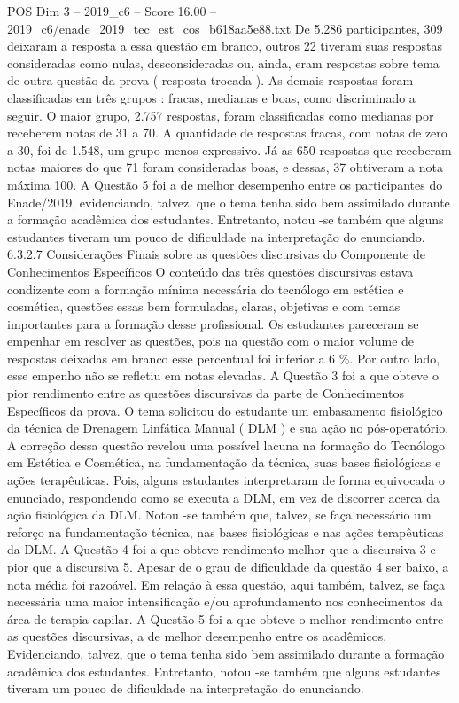 \begin{textsample}{POS Dim 3 – 2019\_c6 – Score 16.00 – 2019\_c6/enade\_2019\_tec\_est\_cos\_b618aa5e88.txt}
De 5.286 participantes, 309 deixaram a resposta a essa questão em branco, outros 22 tiveram suas respostas consideradas como nulas, desconsideradas ou, ainda, eram respostas sobre tema de outra questão da prova ( resposta trocada ).
As demais respostas foram classificadas em três grupos : fracas, medianas e boas, como discriminado a seguir.
O maior grupo, 2.757 respostas, foram classificadas como medianas por receberem notas de 31 a 70.
A quantidade de respostas fracas, com notas de zero a 30, foi de 1.548, um grupo menos expressivo.
Já as 650 respostas que receberam notas maiores do que 71 foram consideradas boas, e dessas, 37 obtiveram a nota máxima 100.
A Questão 5 foi a de melhor desempenho entre os participantes do Enade/2019, evidenciando, talvez, que o tema tenha sido bem assimilado durante a formação acadêmica dos estudantes.
Entretanto, notou -se também que alguns estudantes tiveram um pouco de dificuldade na interpretação do enunciando. 6.3.2.7 Considerações Finais sobre as questões discursivas do Componente de Conhecimentos Específicos O conteúdo das três questões discursivas estava condizente com a formação mínima necessária do tecnólogo em estética e cosmética, questões essas bem formuladas, claras, objetivas e com temas importantes para a formação desse profissional.
Os estudantes pareceram se empenhar em resolver as questões, pois na questão com o maior volume de respostas deixadas em branco esse percentual foi inferior a 6 \%.
Por outro lado, esse empenho não se refletiu em notas elevadas.
A Questão 3 foi a que obteve o pior rendimento entre as questões discursivas da parte de Conhecimentos Específicos da prova.
O tema solicitou do estudante um embasamento fisiológico da técnica de Drenagem Linfática Manual ( DLM ) e sua ação no pós-operatório.
A correção dessa questão revelou uma possível lacuna na formação do Tecnólogo em Estética e Cosmética, na fundamentação da técnica, suas bases fisiológicas e ações terapêuticas.
Pois, alguns estudantes interpretaram de forma equivocada o enunciado, respondendo como se executa a DLM, em vez de discorrer acerca da ação fisiológica da DLM.
Notou -se também que, talvez, se faça necessário um reforço na fundamentação técnica, nas bases fisiológicas e nas ações terapêuticas da DLM.
A Questão 4 foi a que obteve rendimento melhor que a discursiva 3 e pior que a discursiva 5.
Apesar de o grau de dificuldade da questão 4 ser baixo, a nota média foi razoável.
Em relação à essa questão, aqui também, talvez, se faça necessária uma maior intensificação e/ou aprofundamento nos conhecimentos da área de terapia capilar.
A Questão 5 foi a que obteve o melhor rendimento entre as questões discursivas, a de melhor desempenho entre os acadêmicos.
Evidenciando, talvez, que o tema tenha sido bem assimilado durante a formação acadêmica dos estudantes.
Entretanto, notou -se também que alguns estudantes tiveram um pouco de dificuldade na interpretação do enunciando.

\end{textsample}
